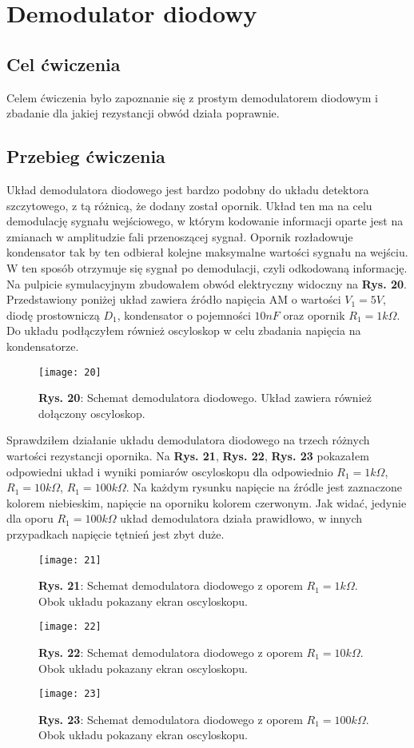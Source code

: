 \documentclass[11pt]{article}
\begin{document}
\section{Demodulator diodowy}
\subsection{Cel ćwiczenia}
Celem ćwiczenia było zapoznanie się z prostym demodulatorem diodowym i zbadanie dla jakiej rezystancji obwód działa poprawnie.
\subsection{Przebieg ćwiczenia}
Układ demodulatora diodowego jest bardzo podobny do układu detektora szczytowego, z tą różnicą, że dodany został opornik. Układ ten ma na celu demodulację sygnału wejściowego, w którym kodowanie informacji oparte jest na zmianach w amplitudzie fali przenoszącej sygnał. Opornik rozładowuje kondensator
tak by ten odbierał kolejne maksymalne wartości sygnału na wejściu. W ten sposób otrzymuje się sygnał po demodulacji, czyli odkodowaną informację. \newline
Na pulpicie symulacyjnym zbudowałem obwód elektryczny widoczny na \textbf{Rys. 20}. Przedstawiony poniżej układ zawiera źródło napięcia AM o wartości $V_1 = 5V$, diodę prostowniczą $D_1$, kondensator o pojemności $10nF$ oraz opornik $R_1 = 1k\Omega$. Do układu podłączyłem również oscyloskop w celu
zbadania napięcia na kondensatorze.
\begin{figure}[H]
\centering
\texttt{[image: 20]}
\caption*{\textbf{Rys. 20}: Schemat demodulatora diodowego. Układ zawiera również dołączony oscyloskop.}
\end{figure}
\noindent Sprawdziłem działanie układu demodulatora diodowego na trzech różnych wartości rezystancji opornika. Na \textbf{Rys. 21}, \textbf{Rys. 22}, \textbf{Rys. 23} pokazałem odpowiedni układ i wyniki pomiarów oscyloskopu dla odpowiednio $R_1 = 1k\Omega$, $R_1 = 10k\Omega$, $R_1 = 100k\Omega$.
Na każdym rysunku napięcie na źródle jest zaznaczone kolorem niebieskim, napięcie na oporniku kolorem czerwonym. Jak widać, jedynie dla oporu $R_1 = 100k\Omega$ układ demodulatora działa prawidłowo, w innych przypadkach napięcie tętnień jest zbyt duże.
\begin{figure}[H]
\centering
\texttt{[image: 21]}
\caption*{\textbf{Rys. 21}: Schemat demodulatora diodowego z oporem $R_1= 1k\Omega$. Obok układu pokazany ekran oscyloskopu. }
\end{figure}
\begin{figure}[H]
\centering
\texttt{[image: 22]}
\caption*{\textbf{Rys. 22}: Schemat demodulatora diodowego z oporem $R_1= 10k\Omega$. Obok układu pokazany ekran oscyloskopu. }
\end{figure}
\begin{figure}[H]
\centering
\texttt{[image: 23]}
\caption*{\textbf{Rys. 23}: Schemat demodulatora diodowego z oporem $R_1= 100k\Omega$. Obok układu pokazany ekran oscyloskopu. }
\end{figure}
\end{document}
